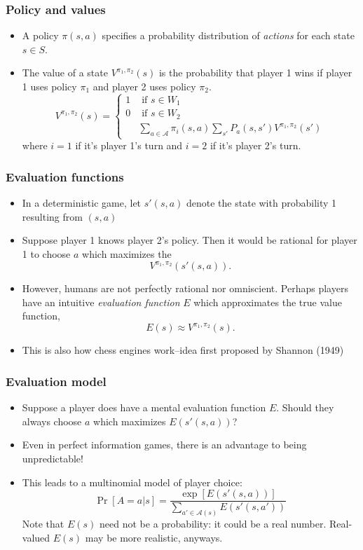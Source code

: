 \documentclass{beamer}
\begin{document}
\begin{frame}
\frametitle{Policy and values}
\begin{itemize}
\item A policy $\pi(s, a)$ specifies a probability distribution of \emph{actions} for each state $s \in S$.
\item The value of a state $V^{\pi_1,\pi_2}(s)$ is the probability that player 1 wins if player 1 uses policy $\pi_1$
and player 2 uses policy $\pi_2$.
\[
V^{\pi_1,\pi_2}(s) = \begin{cases}
1 &\text{ if }s\in W_1\\
0 &\text{ if }s \in W_2\\
& \sum_{a \in \mathcal{A}} \pi_i(s, a) \sum_{s'} P_a(s, s') V^{\pi_1,\pi_2}(s')
\end{cases}
\]
where $i=1$ if it's player 1's turn and $i=2$ if it's player 2's turn.
\end{itemize}
\end{frame}

\begin{frame}
\frametitle{Evaluation functions}
\begin{itemize}
\item In a deterministic game, let $s'(s, a)$ denote the state with probability 1 resulting from $(s, a)$
\item Suppose player 1 knows player 2's policy.  Then it would be rational for player 1 to choose $a$ which maximizes the 
\[
V^{\pi_1,\pi_2}(s'(s, a)).
\]
\item However, humans are not perfectly rational nor omniscient.  Perhaps players have an intuitive \emph{evaluation function} $E$ which approximates the true value function,
\[
E(s) \approx V^{\pi_1,\pi_2}(s).
\]
\item This is also how chess engines work--idea first proposed by Shannon (1949)
\end{itemize}
\end{frame}

\begin{frame}
\frametitle{Evaluation model}
\begin{itemize}
\item Suppose a player does have a mental evaluation function $E$.  Should they always choose $a$ which maximizes $E(s'(s, a))$?
\item Even in perfect information games, there is an advantage to being unpredictable!
\item This leads to a multinomial model of player choice:
\[
\Pr[A = a|s] = \frac{\exp[E(s'(s, a))]}{\sum_{a' \in \mathcal{A}(s)} E(s'(s, a'))}
\]
Note that $E(s)$ need not be a probability: it could be a real number.
Real-valued $E(s)$ may be more realistic, anyways.
\end{itemize}
\end{frame}
\end{document}
